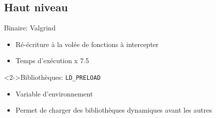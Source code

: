 \documentclass[10.5pt]{beamer}
\begin{document}
\subsection{Haut niveau}
\begin{frame}{\subsecname}
  \begin{alertblock}{Binaire: Valgrind}
    \begin{itemize}
    \item Ré-écriture à la volée de fonctions à intercepter
    \item Temps d'exécution x 7.5
    \end{itemize}
  \end{alertblock}
  
  \begin{alertblock}<2->{Bibliothèques: \texttt{LD\_PRELOAD}}
    \begin{itemize}
    \item Variable d'environnement
    \item Permet de charger des bibliothèques dynamiques avant les autres
    \end{itemize}
  \end{alertblock}
\end{frame}
\end{document}

